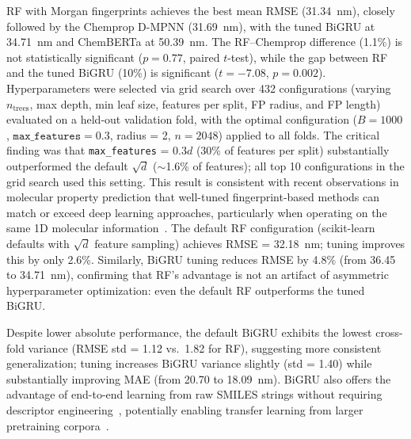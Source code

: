 \documentclass[11pt,a4paper]{article}
\begin{document}
RF with Morgan fingerprints achieves the best mean RMSE (31.34~nm), closely followed by the Chemprop D-MPNN (31.69~nm), with the tuned BiGRU at 34.71~nm and ChemBERTa at 50.39~nm.
The RF--Chemprop difference (1.1\%) is not statistically significant ($p = 0.77$, paired $t$-test), while the gap between RF and the tuned BiGRU (10\%) is significant ($t = -7.08$, $p = 0.002$).
Hyperparameters were selected via grid search over 432 configurations (varying $n_\text{trees}$, max depth, min leaf size, features per split, FP radius, and FP length) evaluated on a held-out validation fold, with the optimal configuration ($B = 1000$, $\texttt{max\_features} = 0.3$, radius = 2, $n = 2048$) applied to all folds.
The critical finding was that \texttt{max\_features} = $0.3d$ (30\% of features per split) substantially outperformed the default $\sqrt{d}$ ($\sim$1.6\% of features); all top 10 configurations in the grid search used this setting.
This result is consistent with recent observations in molecular property prediction that well-tuned fingerprint-based methods can match or exceed deep learning approaches, particularly when operating on the same 1D molecular information~\cite{panapitiya2022evaluation, walters2021applications, fooladi2025evaluating}.
The default RF configuration (scikit-learn defaults with $\sqrt{d}$ feature sampling) achieves RMSE = 32.18~nm; tuning improves this by only 2.6\%.
Similarly, BiGRU tuning reduces RMSE by 4.8\% (from 36.45 to 34.71~nm), confirming that RF's advantage is not an artifact of asymmetric hyperparameter optimization: even the default RF outperforms the tuned BiGRU.

Despite lower absolute performance, the default BiGRU exhibits the lowest cross-fold variance (RMSE std = 1.12 vs.\ 1.82 for RF), suggesting more consistent generalization; tuning increases BiGRU variance slightly (std = 1.40) while substantially improving MAE (from 20.70 to 18.09~nm).
BiGRU also offers the advantage of end-to-end learning from raw SMILES strings without requiring descriptor engineering~\cite{chenMolecularLanguage2023}, potentially enabling transfer learning from larger pretraining corpora~\cite{vermeire2021transfer}.
\end{document}

